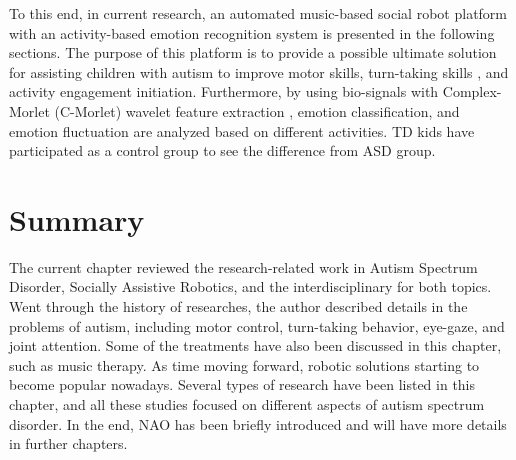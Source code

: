 To this end, in current research, an automated music-based social robot platform with an activity-based emotion 
recognition system is presented in the following sections. The purpose of this platform is to provide a 
possible ultimate solution for assisting children with autism to improve motor skills, turn-taking skills 
, and activity engagement initiation. Furthermore, by using bio-signals with Complex-Morlet (C-Morlet) wavelet feature 
extraction \cite{feng2018wavelet}, emotion classification, and emotion fluctuation are analyzed based on different 
activities. TD kids have participated as a control group to see the difference from ASD group.\\

\section{Summary}
The current chapter reviewed the research-related work in Autism Spectrum Disorder, Socially Assistive Robotics,
and the interdisciplinary for both topics. Went through the history of researches, the author described details in
the problems of autism, including motor control, turn-taking behavior, eye-gaze, and joint attention. Some of
the treatments have also been discussed in this chapter, such as music therapy. As time moving forward, robotic 
solutions starting to become popular nowadays. Several types of research have been listed in this chapter, and all these studies
focused on different aspects of autism spectrum disorder. In the end, NAO has been briefly introduced and will 
have more details in further chapters.
